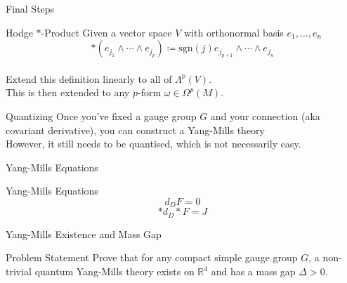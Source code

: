 \documentclass[handout]{beamer}
\newcommand{\Real}{\mathbb{R}}
\begin{document}
  \begin{frame}{Final Steps}
      \pause
      \begin{block}{Hodge $*$-Product}
          Given a vector space $V$ with orthonormal basis ${e_1, \ldots, e_n}$
          $$*(e_{j_1} \wedge \cdots \wedge e_{j_p}) \coloneqq \mathrm{sgn}(j)
          e_{j_{p+1}} \wedge \cdots \wedge e_{j_n}$$ \pause \\
          Extend this definition linearly to all of $\Lambda^p(V)$. \pause \\
          This is then extended to any $p$-form $\omega \in \Omega^p(M)$.
      \end{block}
      \pause
      \begin{block}{Quantizing}
          Once you've fixed a gauge group $G$ and your connection (aka
          covariant derivative), you can construct a Yang-Mills theory\pause\\
          However, it still needs to be quantised, which is not necessarily
          easy.
      \end{block}
  \end{frame}
  \begin{frame}{Yang-Mills Equations}
      \pause
      \begin{block}{Yang-Mills Equations}
          $$d_D F = 0$$
          $$*d_D * F = J$$
      \end{block}
  \end{frame}
  \begin{frame}{Yang-Mills Existence and Mass Gap}
      \begin{block}{Problem Statement}
          Prove that for any compact simple gauge group $G$, a non-trivial
          quantum Yang-Mills theory exists on $\Real^4$ and has a mass gap
          $\Delta > 0$.
      \end{block}
  \end{frame}
\end{document}
